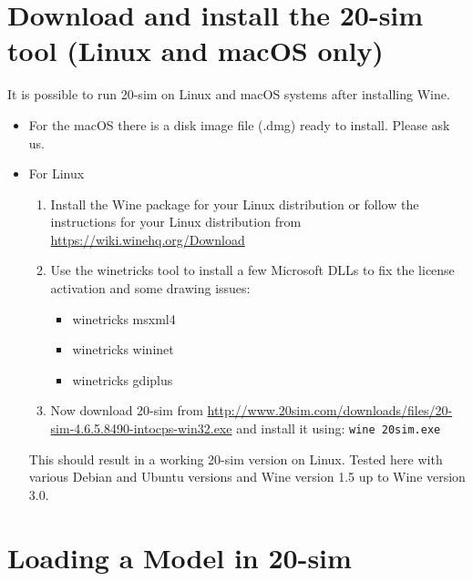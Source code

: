 \documentclass[11pt,a4paper]{../tutorial}
\begin{document}
\section{Download and install the 20-sim tool (Linux and macOS only)}

It is possible to run 20-sim on Linux and macOS systems after installing Wine.
\begin{itemize}
	\item For the macOS there is a disk image file (.dmg) ready to install. Please ask
us. 
	\item For Linux 
		\begin{enumerate} 
			\item Install the Wine package for your Linux distribution or follow the instructions for your Linux distribution from \url{https://wiki.winehq.org/Download}
    			\item Use the winetricks tool to install a few Microsoft DLLs to fix the license activation and some drawing issues:
        			\begin{itemize}
					\item winetricks msxml4
					\item winetricks wininet
					\item winetricks gdiplus 
				\end{itemize}
			\item Now download 20-sim from \url{http://www.20sim.com/downloads/files/20-sim-4.6.5.8490-intocps-win32.exe} and install it using: \verb'wine 20sim.exe'
		\end{enumerate}

This should result in a working 20-sim version on Linux. Tested here with various Debian and Ubuntu versions and Wine version 1.5 up to Wine version 3.0.
\end{itemize}

\newpage 

\section{Loading a Model in 20-sim}
\end{document}
